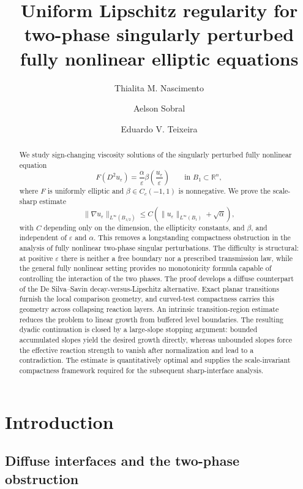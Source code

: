 \documentclass[11pt,letterpaper]{amsart}
\title[Lipschitz regularity]{Uniform Lipschitz regularity for two-phase singularly perturbed fully nonlinear elliptic equations}
\author[T. M. Nascimento]{Thialita M. Nascimento}
\author[A. Sobral]{Aelson Sobral}
\author[E. V. Teixeira]{Eduardo V. Teixeira}
\numberwithin{equation}{section}
\theoremstyle{definition}
\theoremstyle{remark}
\begin{document}
\begin{abstract}
We study sign-changing viscosity solutions of the singularly perturbed fully
nonlinear equation
$$
F(D^2u_\varepsilon)
=
\frac{\alpha}{\varepsilon}
\beta\left(\frac{u_\varepsilon}{\varepsilon}\right)
\qquad\text{in }B_1\subset\mathbb R^n,
$$
where $F$ is uniformly elliptic and
$\beta\in C_c (-1,1)$ is nonnegative. We prove the scale-sharp
estimate
$$
\|\nabla u_\varepsilon\|_{L^\infty(B_{1/2})}
\leq
C\left(
\|u_\varepsilon\|_{L^\infty(B_1)}+\sqrt\alpha
\right),
$$
with $C$ depending only on the dimension, the ellipticity constants, and
$\beta$, and independent of $\varepsilon$ and $\alpha$. This removes a
longstanding compactness obstruction in the analysis of fully nonlinear
two-phase singular perturbations. The difficulty is structural: at positive
$\varepsilon$ there is neither a free boundary nor a prescribed transmission
law, while the general fully nonlinear setting provides no monotonicity
formula capable of controlling the interaction of the two phases. The proof develops a diffuse counterpart of the De Silva--Savin
decay-versus-Lipschitz alternative. Exact planar transitions furnish the local
comparison geometry, and curved-test compactness carries this geometry across
collapsing reaction layers. An intrinsic transition-region estimate reduces
the problem to linear growth from buffered level boundaries. The resulting
dyadic continuation is closed by a large-slope stopping argument: bounded
accumulated slopes yield the desired growth directly, whereas unbounded slopes
force the effective reaction strength to vanish after normalization and lead
to a contradiction. The estimate is quantitatively optimal and supplies the
scale-invariant compactness framework required for the subsequent
sharp-interface analysis.
\end{abstract}

\maketitle

\section{Introduction}\label{sec:intro}

\subsection{Diffuse interfaces and the two-phase obstruction}
\end{document}

